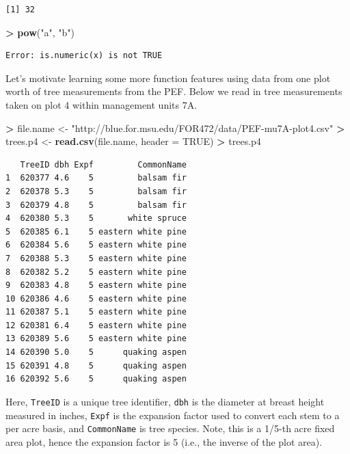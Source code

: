 \documentclass[]{krantz}
\makeatletter
\newenvironment{Shaded}{\begin{snugshade}}{\end{snugshade}}
\newcommand{\KeywordTok}[1]{\textcolor[rgb]{0.27,0.27,0.27}{\textbf{#1}}}
\newcommand{\DataTypeTok}[1]{\textcolor[rgb]{0.27,0.27,0.27}{#1}}
\newcommand{\StringTok}[1]{\textcolor[rgb]{0.5,0.5,0.5}{#1}}
\newcommand{\OtherTok}[1]{\textcolor[rgb]{0.37,0.37,0.37}{#1}}
\newcommand{\OperatorTok}[1]{\textcolor[rgb]{0.43,0.43,0.43}{\textbf{#1}}}
\newcommand{\NormalTok}[1]{#1}
\newenvironment{kframe}{%
\medskip{}
\setlength{\fboxsep}{.8em}
 \def\at@end@of@kframe{}%
 \ifinner\ifhmode%
  \def\at@end@of@kframe{\end{minipage}}%
  \begin{minipage}{\columnwidth}%
 \fi\fi%
 \def\FrameCommand##1{\hskip\@totalleftmargin \hskip-\fboxsep
 \colorbox{shadecolor}{##1}\hskip-\fboxsep
     \hskip-\linewidth \hskip-\@totalleftmargin \hskip\columnwidth}%
 \MakeFramed {\advance\hsize-\width
   \@totalleftmargin\z@ \linewidth\hsize
   \@setminipage}}%
 {\par\unskip\endMakeFramed%
 \at@end@of@kframe}
\renewenvironment{Shaded}{\begin{kframe}}{\end{kframe}}
\theoremstyle{definition}
\theoremstyle{definition}
\theoremstyle{definition}
\theoremstyle{remark}
\makeatother
\begin{document}
\begin{verbatim}
[1] 32
\end{verbatim}

\begin{Shaded}
\begin{Highlighting}[]
\OperatorTok{>}\StringTok{ }\KeywordTok{pow}\NormalTok{(}\StringTok{"a"}\NormalTok{, }\StringTok{"b"}\NormalTok{)}
\end{Highlighting}
\end{Shaded}

\begin{verbatim}
Error: is.numeric(x) is not TRUE
\end{verbatim}

Let's motivate learning some more function features using data from one
plot worth of tree measurements from the PEF. Below we read in tree
measurements taken on plot 4 within management units 7A.

\begin{Shaded}
\begin{Highlighting}[]
\OperatorTok{>}\StringTok{ }\NormalTok{file.name <-}\StringTok{ "http://blue.for.msu.edu/FOR472/data/PEF-mu7A-plot4.csv"}
\OperatorTok{>}\StringTok{ }\NormalTok{trees.p4 <-}\StringTok{ }\KeywordTok{read.csv}\NormalTok{(file.name, }\DataTypeTok{header =} \OtherTok{TRUE}\NormalTok{)}
\OperatorTok{>}\StringTok{ }\NormalTok{trees.p4}
\end{Highlighting}
\end{Shaded}

\begin{verbatim}
   TreeID dbh Expf         CommonName
1  620377 4.6    5         balsam fir
2  620378 5.3    5         balsam fir
3  620379 4.8    5         balsam fir
4  620380 5.3    5       white spruce
5  620385 6.1    5 eastern white pine
6  620384 5.6    5 eastern white pine
7  620388 5.3    5 eastern white pine
8  620382 5.2    5 eastern white pine
9  620383 4.8    5 eastern white pine
10 620386 4.6    5 eastern white pine
11 620387 5.1    5 eastern white pine
12 620381 6.4    5 eastern white pine
13 620389 5.6    5 eastern white pine
14 620390 5.0    5      quaking aspen
15 620391 4.8    5      quaking aspen
16 620392 5.6    5      quaking aspen
\end{verbatim}

Here, \texttt{TreeID} is a unique tree identifier, \texttt{dbh} is the
diameter at breast height measured in inches, \texttt{Expf} is the
expansion factor used to convert each stem to a per acre basis, and
\texttt{CommonName} is tree species. Note, this is a 1/5-th acre fixed
area plot, hence the expansion factor is 5 (i.e., the inverse of the
plot area).
\end{document}
